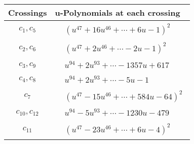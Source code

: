 \documentclass[1p]{elsarticle_modified}
\theoremstyle{definition}
\begin{document}
\begin{tabular}{m{50pt}|m{274pt}}
Crossings & \hspace{64pt}u-Polynomials at each crossing \\
\hline $$\begin{aligned}c_{1},c_{5}\end{aligned}$$&$\begin{aligned}
&(u^{47}+16 u^{46}+\cdots+6 u-1)^{2}
\end{aligned}$\\
\hline $$\begin{aligned}c_{2},c_{6}\end{aligned}$$&$\begin{aligned}
&(u^{47}+2 u^{46}+\cdots-2 u-1)^{2}
\end{aligned}$\\
\hline $$\begin{aligned}c_{3},c_{9}\end{aligned}$$&$\begin{aligned}
&u^{94}+2 u^{93}+\cdots-1357 u+617
\end{aligned}$\\
\hline $$\begin{aligned}c_{4},c_{8}\end{aligned}$$&$\begin{aligned}
&u^{94}+2 u^{93}+\cdots-5 u-1
\end{aligned}$\\
\hline $$\begin{aligned}c_{7}\end{aligned}$$&$\begin{aligned}
&(u^{47}-15 u^{46}+\cdots+584 u-64)^{2}
\end{aligned}$\\
\hline $$\begin{aligned}c_{10},c_{12}\end{aligned}$$&$\begin{aligned}
&u^{94}-5 u^{93}+\cdots-1230 u-479
\end{aligned}$\\
\hline $$\begin{aligned}c_{11}\end{aligned}$$&$\begin{aligned}
&(u^{47}-23 u^{46}+\cdots+6 u-4)^{2}
\end{aligned}$\\
\hline
\end{tabular}\\~\\
\newpage\renewcommand{\arraystretch}{1}
\end{document}
